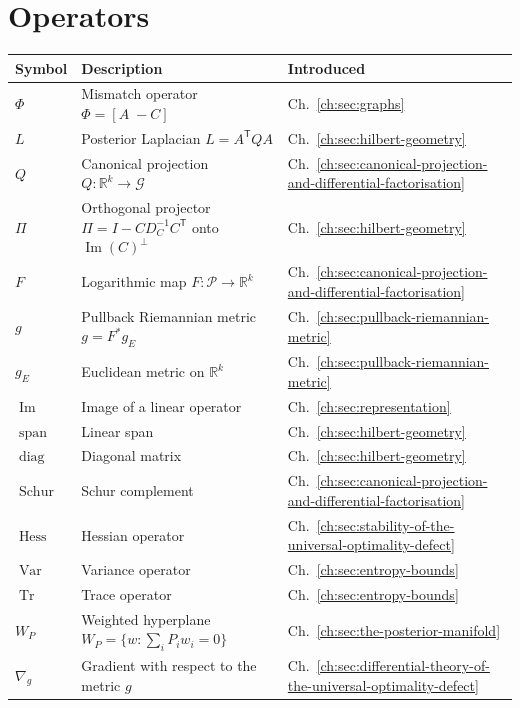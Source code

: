 \section*{Operators}

\begin{center}
\begin{tabular}{lll}
\hline
\textbf{Symbol} & \textbf{Description} & \textbf{Introduced} \\
\hline
  $\Phi$ & Mismatch operator $\Phi=[A\;-C]$ & Ch.~\ref{ch:sec:graphs} \\
  $L$ & Posterior Laplacian $L=A^{\mathsf T}QA$ & Ch.~\ref{ch:sec:hilbert-geometry} \\
  $Q$ & Canonical projection $Q:\mathbb R^k\to\mathcal G$ & Ch.~\ref{ch:sec:canonical-projection-and-differential-factorisation} \\
  $\Pi$ & Orthogonal projector $\Pi=I-C D_C^{-1}C^{\mathsf T}$ onto $\operatorname{Im}(C)^\perp$ & Ch.~\ref{ch:sec:hilbert-geometry} \\
  $F$ & Logarithmic map $F:\mathcal P\to\mathbb R^k$ & Ch.~\ref{ch:sec:canonical-projection-and-differential-factorisation} \\
  $g$ & Pullback Riemannian metric $g=F^*g_E$ & Ch.~\ref{ch:sec:pullback-riemannian-metric} \\
  $g_E$ & Euclidean metric on $\mathbb R^k$ & Ch.~\ref{ch:sec:pullback-riemannian-metric} \\
  $\operatorname{Im}$ & Image of a linear operator & Ch.~\ref{ch:sec:representation} \\
  $\operatorname{span}$ & Linear span & Ch.~\ref{ch:sec:hilbert-geometry} \\
  $\operatorname{diag}$ & Diagonal matrix & Ch.~\ref{ch:sec:hilbert-geometry} \\
  $\operatorname{Schur}$ & Schur complement & Ch.~\ref{ch:sec:canonical-projection-and-differential-factorisation} \\
  $\operatorname{Hess}$ & Hessian operator & Ch.~\ref{ch:sec:stability-of-the-universal-optimality-defect} \\
  $\operatorname{Var}$ & Variance operator & Ch.~\ref{ch:sec:entropy-bounds} \\
  $\operatorname{Tr}$ & Trace operator & Ch.~\ref{ch:sec:entropy-bounds} \\
  $W_P$ & Weighted hyperplane $W_P=\{w:\sum_i P_i w_i=0\}$ & Ch.~\ref{ch:sec:the-posterior-manifold} \\
  $\nabla_g$ & Gradient with respect to the metric $g$ & Ch.~\ref{ch:sec:differential-theory-of-the-universal-optimality-defect} \\
\hline
\end{tabular}
\end{center}

